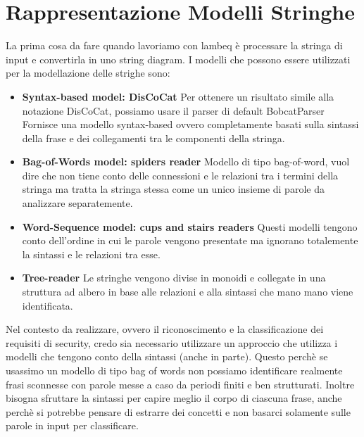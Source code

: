 \documentclass{report}
\begin{document}
    \section{Rappresentazione Modelli Stringhe}
        La prima cosa da fare quando lavoriamo con lambeq è processare la stringa
        di input e convertirla in uno string diagram.
        \newline I modelli che possono essere utilizzati per la modellazione delle strighe sono:
            \begin{itemize}
                \item   \textbf{Syntax-based model: DisCoCat}
                        \newline Per ottenere un risultato simile alla notazione DisCoCat, possiamo usare il parser di default BobcatParser
                                 Fornisce una modello syntax-based ovvero completamente basati sulla sintassi della frase e dei collegamenti 
                                 tra le componenti della stringa.
                \item   \textbf{Bag-of-Words model: spiders reader}
                        \newline Modello di tipo bag-of-word, vuol dire che non tiene conto delle connessioni e le relazioni tra i termini della stringa
                                 ma tratta la stringa stessa come un unico insieme di parole da analizzare separatemente.
                \item   \textbf{Word-Sequence model: cups and stairs readers}
                        \newline Questi modelli tengono conto dell'ordine in cui le parole vengono presentate ma ignorano totalemente la sintassi e le
                                 relazioni tra esse.    
                \item   \textbf{Tree-reader}
                        \newline Le stringhe vengono divise in monoidi e collegate in una struttura ad albero in base alle relazioni e alla sintassi che
                                 mano mano viene identificata. 
            \end{itemize}
            
        \leavevmode\newline
        Nel contesto da realizzare, ovvero il riconoscimento e la classificazione dei requisiti di security, credo sia necessario utilizzare un approccio
        che utilizza i modelli che tengono conto della sintassi (anche in parte). 
        \newline Questo perchè se usassimo un modello di tipo bag of words non possiamo identificare realmente frasi sconnesse con parole messe a caso da 
        periodi finiti e ben strutturati. 
        \newline Inoltre bisogna sfruttare la sintassi per capire meglio il corpo di ciascuna frase, anche perchè si potrebbe pensare di estrarre dei 
        concetti e non basarci solamente sulle parole in input per classificare.
        
\end{document}

